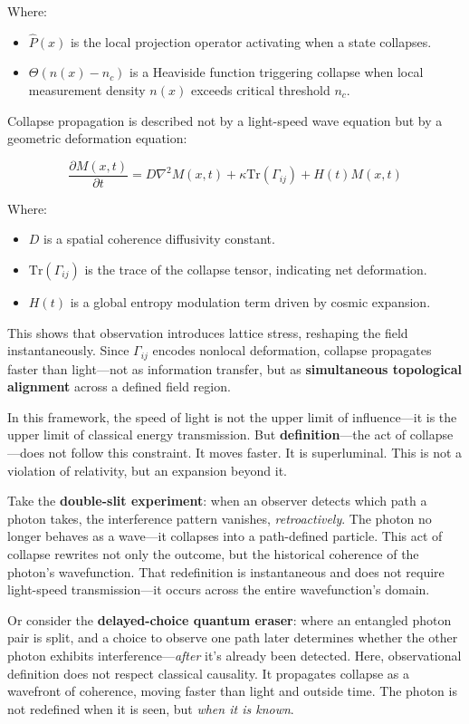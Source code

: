 Where:
\begin{itemize}
  \item $\hat{P}(x)$ is the local projection operator activating when a state collapses.
  \item $\Theta(n(x) - n_c)$ is a Heaviside function triggering collapse when local measurement density $n(x)$ exceeds critical threshold $n_c$.
\end{itemize}

Collapse propagation is described not by a light-speed wave equation but by a geometric deformation equation:

\[
\frac{\partial M(x, t)}{\partial t} = D \nabla^2 M(x, t) + \kappa \text{Tr}(\Gamma_{ij}) + H(t) M(x, t)
\]

Where:
\begin{itemize}
  \item $D$ is a spatial coherence diffusivity constant.
  \item $\text{Tr}(\Gamma_{ij})$ is the trace of the collapse tensor, indicating net deformation.
  \item $H(t)$ is a global entropy modulation term driven by cosmic expansion.
\end{itemize}

This shows that observation introduces lattice stress, reshaping the field instantaneously. Since $\Gamma_{ij}$ encodes nonlocal deformation, collapse propagates faster than light---not as information transfer, but as \textbf{simultaneous topological alignment} across a defined field region.

In this framework, the speed of light is not the upper limit of influence---it is the upper limit of classical energy transmission. But \textbf{definition}---the act of collapse---does not follow this constraint. It moves faster. It is superluminal. This is not a violation of relativity, but an expansion beyond it.

Take the \textbf{double-slit experiment}: when an observer detects which path a photon takes, the interference pattern vanishes, \textit{retroactively}. The photon no longer behaves as a wave---it collapses into a path-defined particle. This act of collapse rewrites not only the outcome, but the historical coherence of the photon's wavefunction. That redefinition is instantaneous and does not require light-speed transmission---it occurs across the entire wavefunction's domain.

Or consider the \textbf{delayed-choice quantum eraser}: where an entangled photon pair is split, and a choice to observe one path later determines whether the other photon exhibits interference---\textit{after} it's already been detected. Here, observational definition does not respect classical causality. It propagates collapse as a wavefront of coherence, moving faster than light and outside time. The photon is not redefined when it is seen, but \textit{when it is known}.

